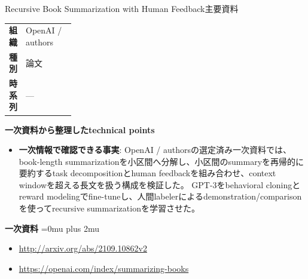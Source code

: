 \begin{technicalnote}{Recursive Book Summarization with Human Feedback}{主要資料}
\begingroup
\begin{tabularx}{\linewidth}{@{}>{\bfseries}p{0.22\linewidth}X@{}}
組織 & OpenAI / authors \\
種別 & 論文 \\
時系列 & — \\
\end{tabularx}
\smallskip
{\bfseries 一次資料から整理したtechnical points}
\begin{itemize}[leftmargin=1.5em,itemsep=0.35em]
\item \textbf{一次情報で確認できる事実}: OpenAI / authorsの選定済み一次資料では、book-length summarizationを小区間へ分解し、小区間のsummaryを再帰的に要約するtask decompositionとhuman feedbackを組み合わせ、context windowを超える長文を扱う構成を検証した。 GPT-3をbehavioral cloningとreward modelingでfine-tuneし、人間labelerによるdemonstration/comparisonを使ってrecursive summarizationを学習させた。
\end{itemize}
\begin{minipage}{\linewidth}
\begin{samepage}
{\bfseries 一次資料}
\begingroup\sloppy
\Urlmuskip=0mu plus 2mu\relax
\begin{itemize}[leftmargin=1.5em,itemsep=0.25em]
\item {\scriptsize\url{http://arxiv.org/abs/2109.10862v2}}
\item {\scriptsize\url{https://openai.com/index/summarizing-books}}
\end{itemize}
\endgroup
\end{samepage}
\end{minipage}
\endgroup
\end{technicalnote}
\medskip

